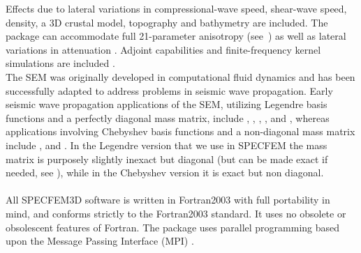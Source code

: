 Effects due to lateral variations in compressional-wave speed, shear-wave
speed, density, a 3D crustal model, topography and bathymetry are
included. The package can accommodate full 21-parameter anisotropy
(see~\citet{ChTr07}) as well as lateral variations in attenuation
\citep{SaKoTr10}. Adjoint capabilities and finite-frequency kernel
simulations are included \citep{TrKoLi08,PeKoLuMaLeCaLeMaLiBlNiBaTr11,LiTr06,FiIgBuKe09,ViOp09}.\\


The SEM was originally developed in computational fluid dynamics \citep{Pat84,MaPa89}
and has been successfully adapted to address problems in seismic wave
propagation. Early seismic wave propagation applications of the SEM,
utilizing Legendre basis functions and a perfectly diagonal mass matrix,
include \citet{CoJoTo93}, \citet{Kom97}, \citet{FaMaPaQu97}, \citet{CaGa97},
\citet{KoVi98} and \citet{KoTr99}, whereas applications involving
Chebyshev basis functions and a non-diagonal mass matrix include \citet{SePr94},
\citet{PrCaSe94} and \citet{SePrPr95}.
In the Legendre version that we use in SPECFEM the mass matrix is purposely slightly inexact but diagonal (but can be made exact if needed, see \cite{Teu15}),
while in the Chebyshev version it is exact but non diagonal.\\


\\


All SPECFEM3D software is written in Fortran2003 with full portability
in mind, and conforms strictly to the Fortran2003 standard. It uses
no obsolete or obsolescent features of Fortran. The package uses parallel
programming based upon the Message Passing Interface (MPI) \citep{GrLuSk94,Pac97}.\\


